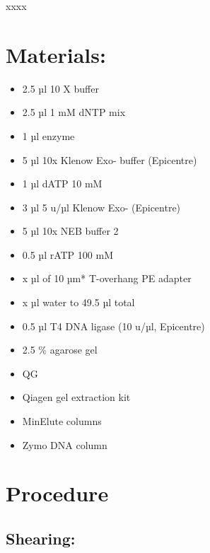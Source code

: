 \documentclass[
  letterpaper,
  DIV=11,
  numbers=noendperiod]{scrreprt}
\providecommand{\tightlist}{%
  \setlength{\itemsep}{0pt}\setlength{\parskip}{0pt}}\usepackage{longtable,booktabs,array}
\begin{document}
\begin{tcolorbox}[enhanced jigsaw, toprule=.15mm, breakable, coltitle=black, leftrule=.75mm, title=\textcolor{quarto-callout-warning-color}{\faExclamationTriangle}\hspace{0.5em}{NOTES}, bottomrule=.15mm, toptitle=1mm, bottomtitle=1mm, colframe=quarto-callout-warning-color-frame, opacityback=0, colback=white, opacitybacktitle=0.6, colbacktitle=quarto-callout-warning-color!10!white, rightrule=.15mm, titlerule=0mm, arc=.35mm, left=2mm]

xxxx

\end{tcolorbox}

\hypertarget{materials-24}{%
\section{Materials:}\label{materials-24}}

\begin{itemize}
\tightlist
\item
  2.5 µl 10 X buffer
\item
  2.5 µl 1 mM dNTP mix
\item
  1 µl enzyme
\item
  5 µl 10x Klenow Exo- buffer (Epicentre)
\item
  1 µl dATP 10 mM
\item
  3 µl 5 u/µl Klenow Exo- (Epicentre)
\item
  5 µl 10x NEB buffer 2
\item
  0.5 µl rATP 100 mM
\item
  x µl of 10 µm* T-overhang PE adapter
\item
  x µl water to 49.5 µl total
\item
  0.5 µl T4 DNA ligase (10 u/µl, Epicentre)
\item
  2.5 \% agarose gel
\item
  QG
\item
  Qiagen gel extraction kit
\item
  MinElute columns
\item
  Zymo DNA column
\end{itemize}

\hypertarget{procedure-23}{%
\section{Procedure}\label{procedure-23}}

\hypertarget{shearing}{%
\subsection{Shearing:}\label{shearing}}
\end{document}
